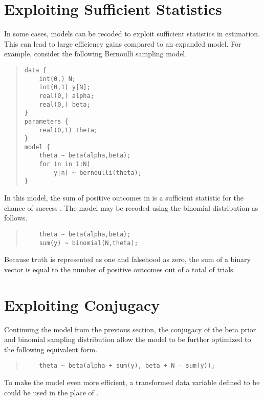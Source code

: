 \section{Exploiting Sufficient Statistics}

In some cases, models can be recoded to exploit sufficient statistics
in estimation.  This can lead to large efficiency gains compared to an
expanded model.  For example, consider the following Bernoulli
sampling model.
%
\begin{quote}
\begin{Verbatim}
data {
    int(0,) N;
    int(0,1) y[N];
    real(0,) alpha;
    real(0,) beta;
}
parameters {
    real(0,1) theta;
}
model {
    theta ~ beta(alpha,beta);
    for (n in 1:N) 
        y[n] ~ bernoulli(theta);
}
\end{Verbatim}
\end{quote}
%
In this model, the sum of positive outcomes in  is a
sufficient statistic for the chance of success .  The
model may be recoded using the binomial distribution as follows.
%
\begin{quote}
\begin{Verbatim}
    theta ~ beta(alpha,beta);
    sum(y) ~ binomial(N,theta);
\end{Verbatim}
\end{quote}
%
Because truth is represented as one and falsehood as zero, the sum
 of a binary vector  is equal to the number of
positive outcomes out of a total of  trials.  



\section{Exploiting Conjugacy}


Continuing the model from the previous section, the conjugacy of the
beta prior and binomial sampling distribution allow the model to be
further optimized to the following equivalent form.
%
\begin{quote}
\begin{Verbatim}
    theta ~ beta(alpha + sum(y), beta + N - sum(y));
\end{Verbatim}
\end{quote}
%
To make the model even more efficient, a transformed data variable
defined to be  could be used in the place of .



